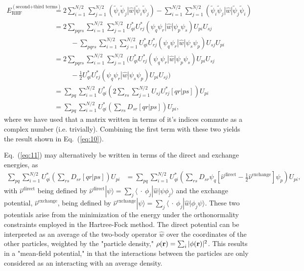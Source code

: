 \documentclass[a4paper]{article}
\newcommand{\eq} [1]{Eq.\ (\ref{eq:#1})}
\newcommand{\nn}{\nonumber}
\begin{document}
\begin{align}
E_\text{RHF}^{(\text{second+third terms})} &= 2\sum_{i=1}^{N/2}\sum_{j=1}^{N/2} (\tilde{\psi}_i \tilde{\psi}_j | \hat{w} | \tilde{\psi}_i \tilde{\psi}_j) -  \sum_{i=1}^{N/2}\sum_{j=1}^{N/2}(\tilde{\psi}_i \tilde{\psi}_j | \hat{w} | \tilde{\psi}_j\tilde{\psi}_i) \nn\\
%
&= 2\sum_{pqrs}\sum_{i=1}^{N/2}\sum_{j=1}^{N/2}U^*_{qi} U^*_{rj}({\psi}_q {\psi}_r | \hat{w} | {\psi}_p {\psi}_s)U_{pi}U_{sj}   \nn\\
& \ \ \ \ \ \ \ \ \ \ \ -\sum_{pqrs}\sum_{i=1}^{N/2}\sum_{j=1}^{N/2}U^*_{qi} U^*_{rj}({\psi}_q {\psi}_r | \hat{w} | {\psi}_s{\psi}_p)U_{sj}U_{pi} \nn\\
&= 2\sum_{pqrs}\sum_{i=1}^{N/2}\sum_{j=1}^{N/2}\bigg(U^*_{qi} U^*_{rj}({\psi}_q {\psi}_r | \hat{w} | {\psi}_p {\psi}_s)U_{pi}U_{sj}   \nn\\
& \ \ \ \ \ \ \ \ \ \ \ -\frac{1}{2} U^*_{qi} U^*_{rj}({\psi}_q {\psi}_r | \hat{w} | {\psi}_s{\psi}_p)U_{pi}U_{sj}\bigg) \nn\\
&= \sum_{pq}\sum_{i=1}^{N/2} U^*_{qi} \left(2\sum_{rs}\sum_{j=1}^{N/2} U_{sj}U^*_{rj} [qr|ps]\right) U_{pi} \nn\\
&= \sum_{pq}\sum_{i=1}^{N/2} U^*_{qi} \left(\sum_{rs}D_{sr} [qr|ps]\right) U_{pi}, \label{eq:11}
\end{align}
where we have used that a matrix written in terms of it's indices commute as a complex number (i.e. trivially). Combining the first term with these two yields the result shown in \eq{10}.

\eq{11} may alternatively be written in terms of the direct and exchange energies, as
\begin{align}
\sum_{pq}\sum_{i=1}^{N/2} U^*_{qi} \left(\sum_{rs}D_{sr} [qr|ps]\right) U_{pi} &= \sum_{pq}\sum_{i=1}^{N/2} U^*_{qi} \left(\sum_{rs}D_{sr} \psi_q \left[\hat{\nu}^\text{direct}-\frac{1}{2}\hat{\nu}^\text{exchange} \right] \psi_p \right) U_{pi},
\end{align}
with $\hat{\nu}^\text{direct}$ being defined by $\hat{\nu}^\text{direct} |\psi\rangle = \sum_j \langle \ \cdot \ \phi_j | \hat{w}|\psi \phi_j\rangle$ and the exchange potential, $\hat{\nu}^\text{exchange}$, being defined by $\hat{\nu}^\text{exchange} |\psi\rangle = \sum_j \langle \ \cdot \ \phi_j | \hat{w}| \phi_j\psi\rangle$. These two potentials arise from the minimization of the energy under the orthonormality constraints employed in the Hartree-Fock method. The direct potential can be interpreted as an average of the two-body operator $\hat{w}$ over the coordinates of the other particles, weighted by the "particle density," $\rho({\bf r})=\sum_i|\phi({\bf r})|^2$. This results in a "mean-field potential," in that the interactions between the particles are only considered as an interacting with an average density.
\end{document}
